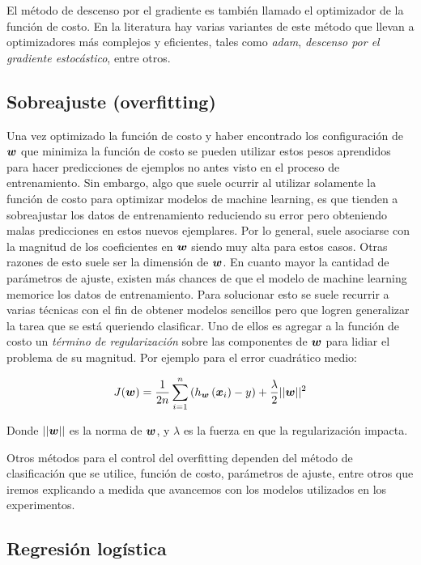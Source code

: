 El método de descenso por el gradiente es también llamado el optimizador de la
función de costo. En la literatura hay varias variantes de este método que
llevan a optimizadores más complejos y eficientes, tales como \emph{adam},
\emph{descenso por el gradiente estocástico}, entre otros.

\subsection{Sobreajuste (overfitting)}

Una vez optimizado la función de costo y haber encontrado los configuración de
$\boldsymbol{w}$ que minimiza la función de costo se pueden utilizar estos pesos
aprendidos para hacer predicciones de ejemplos no antes visto en el proceso de
entrenamiento. Sin embargo, algo que suele ocurrir al utilizar solamente la
función de costo para optimizar modelos de machine learning, es que tienden a
sobreajustar los datos de entrenamiento reduciendo su error pero obteniendo
malas predicciones en estos nuevos ejemplares. Por lo general, suele asociarse
con la magnitud de los coeficientes en $\boldsymbol{w}$ siendo muy alta para estos
casos. Otras razones de esto suele ser la dimensión de $\boldsymbol{w}$. En cuanto
mayor la cantidad de parámetros de ajuste, existen más chances de que el modelo
de machine learning memorice los datos de entrenamiento. Para solucionar esto se
suele recurrir a varias técnicas con el fin de obtener modelos sencillos pero
que logren generalizar la tarea que se está queriendo clasificar. Uno de ellos
es agregar a la función de costo un \emph{término de regularización} sobre las
componentes de $\boldsymbol{w}$ para lidiar el problema de su magnitud. Por ejemplo
para el error cuadrático medio:

\begin{align}
    J(\boldsymbol{w}) = \frac{1}{2n} \sum_{i=1}^{n}\left( h_{\boldsymbol{w}}\left( \boldsymbol{x}_{i}\right) - y \right) +
                  \frac{\lambda}{2} ||\boldsymbol{w}||^{2}
\end{align}

Donde $||\boldsymbol{w}||$ es la norma de $\boldsymbol{w}$, y $\lambda$ es la fuerza en que
la regularización impacta.

Otros métodos para el control del overfitting dependen del método de
clasificación que se utilice, función de costo, parámetros de ajuste, entre
otros que iremos explicando a medida que avancemos con los modelos utilizados en
los experimentos.

\subsection{Regresión logística}

